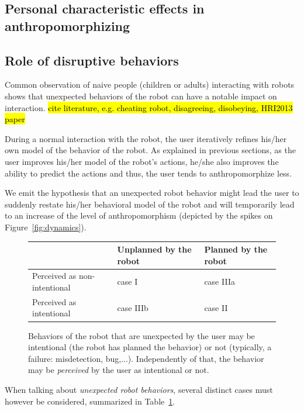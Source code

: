 \documentclass[lettersize, apacite, twoside, HRI]{apa_HRI}
\begin{document}
\subsection{Personal characteristic effects in anthropomorphizing}
\label{sec:8.3}

\subsection{Role of disruptive behaviors}
\label{sec:disruptive}

Common observation of naive people (children or adults) interacting with robots
shows that unexpected behaviors of the robot can have a notable impact on
interaction. \hl{cite literature, e.g. cheating robot, disagreeing, disobeying, HRI2013 paper}

During a normal interaction with the robot, the user iteratively refines his/her own
model of the behavior of the robot. As explained in previous sections, as the
user improves his/her model of the robot's actions, he/she also improves the ability to predict
the actions and thus, the user tends to anthropomorphize less.

We emit the hypothesis that an unexpected robot behavior might lead the user to
suddenly restate his/her behavioral model of the robot and will temporarily lead to
an increase of the level of anthropomorphism (depicted by the spikes on
Figure~\ref{fig:dynamics}).



\begin{figure}\footnotesize
    \begin{tabular}{  >{\centering\arraybackslash}m{2cm} | >{\centering\arraybackslash}m{2cm} | >{\centering\arraybackslash}m{2cm} }
     & Unplanned by the robot & Planned by the robot \\ \hline
    Perceived as non-intentional & case I  & case IIIa  \\ \hline
    Perceived as intentional &  case IIIb & case II 
    \end{tabular}
\caption{
    Behaviors of the robot that are unexpected by the user may be intentional
    (the robot has planned the behavior) or not (typically, a failure:
    misdetection, bug,...). Independently of that, the behavior may be
    \emph{perceived} by the user as intentional or not.}
\label{fig:perceptionUnexpectedBehavior}
\end{figure}

When talking about \emph{unexpected robot behaviors}, several distinct cases
must however be considered, summarized in Table~\ref{fig:perceptionUnexpectedBehavior}.
\end{document}
